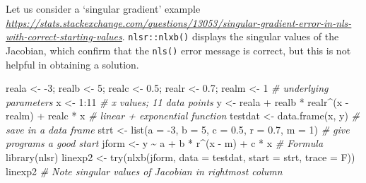 \documentclass[
]{article}
\newenvironment{Shaded}{\begin{snugshade}}{\end{snugshade}}
\newcommand{\AttributeTok}[1]{\textcolor[rgb]{0.77,0.63,0.00}{#1}}
\newcommand{\CommentTok}[1]{\textcolor[rgb]{0.56,0.35,0.01}{\textit{#1}}}
\newcommand{\DecValTok}[1]{\textcolor[rgb]{0.00,0.00,0.81}{#1}}
\newcommand{\FloatTok}[1]{\textcolor[rgb]{0.00,0.00,0.81}{#1}}
\newcommand{\FunctionTok}[1]{\textcolor[rgb]{0.00,0.00,0.00}{#1}}
\newcommand{\NormalTok}[1]{#1}
\newcommand{\OtherTok}[1]{\textcolor[rgb]{0.56,0.35,0.01}{#1}}
\newcommand{\SpecialCharTok}[1]{\textcolor[rgb]{0.00,0.00,0.00}{#1}}
\begin{document}
Let us consider a `singular gradient' example
\emph{\url{https://stats.stackexchange.com/questions/13053/singular-gradient-error-in-nls-with-correct-starting-values}}.
\texttt{nlsr::nlxb()} displays the singular values of the Jacobian,
which confirm that the \texttt{nls()} error message is correct, but this
is not helpful in obtaining a solution.

\begin{Shaded}
\begin{Highlighting}[]
\NormalTok{reala }\OtherTok{\textless{}{-}} \SpecialCharTok{{-}}\DecValTok{3}\NormalTok{; realb }\OtherTok{\textless{}{-}} \DecValTok{5}\NormalTok{; realc }\OtherTok{\textless{}{-}} \FloatTok{0.5}\NormalTok{; realr }\OtherTok{\textless{}{-}} \FloatTok{0.7}\NormalTok{; realm }\OtherTok{\textless{}{-}} \DecValTok{1} \CommentTok{\# underlying parameters}
\NormalTok{x }\OtherTok{\textless{}{-}} \DecValTok{1}\SpecialCharTok{:}\DecValTok{11} \CommentTok{\# x values; 11 data points}
\NormalTok{y }\OtherTok{\textless{}{-}}\NormalTok{ reala }\SpecialCharTok{+}\NormalTok{ realb }\SpecialCharTok{*}\NormalTok{ realr}\SpecialCharTok{\^{}}\NormalTok{(x }\SpecialCharTok{{-}}\NormalTok{ realm) }\SpecialCharTok{+}\NormalTok{ realc }\SpecialCharTok{*}\NormalTok{ x }\CommentTok{\# linear + exponential function}
\NormalTok{testdat }\OtherTok{\textless{}{-}} \FunctionTok{data.frame}\NormalTok{(x, y) }\CommentTok{\# save in a data frame}
\NormalTok{strt }\OtherTok{\textless{}{-}} \FunctionTok{list}\NormalTok{(}\AttributeTok{a =} \SpecialCharTok{{-}}\DecValTok{3}\NormalTok{, }\AttributeTok{b =} \DecValTok{5}\NormalTok{, }\AttributeTok{c =} \FloatTok{0.5}\NormalTok{, }\AttributeTok{r =} \FloatTok{0.7}\NormalTok{, }\AttributeTok{m =} \DecValTok{1}\NormalTok{) }\CommentTok{\# give programs a good start}
\NormalTok{jform }\OtherTok{\textless{}{-}}\NormalTok{ y }\SpecialCharTok{\textasciitilde{}}\NormalTok{ a }\SpecialCharTok{+}\NormalTok{ b }\SpecialCharTok{*}\NormalTok{ r}\SpecialCharTok{\^{}}\NormalTok{(x }\SpecialCharTok{{-}}\NormalTok{ m) }\SpecialCharTok{+}\NormalTok{ c }\SpecialCharTok{*}\NormalTok{ x }\CommentTok{\# Formula}
\FunctionTok{library}\NormalTok{(nlsr)}
\NormalTok{linexp2 }\OtherTok{\textless{}{-}} \FunctionTok{try}\NormalTok{(}\FunctionTok{nlxb}\NormalTok{(jform, }\AttributeTok{data =}\NormalTok{ testdat, }\AttributeTok{start =}\NormalTok{ strt, }\AttributeTok{trace =}\NormalTok{ F))}
\NormalTok{linexp2 }\CommentTok{\# Note singular values of Jacobian in rightmost column}
\end{Highlighting}
\end{Shaded}
\end{document}
